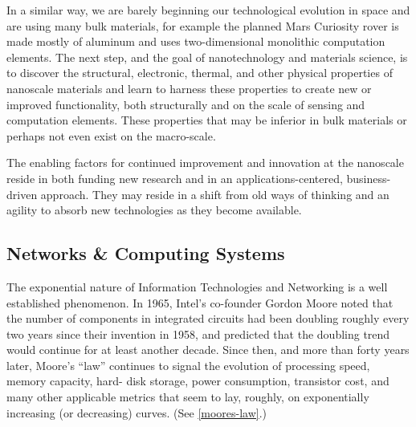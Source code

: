 \documentclass[letter,11pt]{article}
\begin{document}
In a similar way, we are barely beginning our technological evolution in space
and are using many bulk materials, for example the planned Mars Curiosity rover
is made mostly of aluminum and uses two-dimensional monolithic computation
elements. The next step, and the goal of nanotechnology and materials science,
is to discover the structural, electronic, thermal, and other physical
properties of nanoscale materials and learn to harness these properties to
create new or improved functionality, both structurally and on the scale of
sensing and computation elements. These properties that may be inferior in bulk
materials or perhaps not even exist on the macro-scale.

The enabling factors for continued improvement and innovation at the nanoscale
reside in both funding new research and in an applications-centered,
business-driven approach. They may reside in a shift from old ways of thinking
and an agility to absorb new technologies as they become available.

\subsection{Networks \& Computing Systems}
\label{et-computing}

The exponential nature of Information Technologies and Networking is a well
established phenomenon. In 1965, Intel's co-founder Gordon Moore noted that the
number of components in integrated circuits had been doubling roughly every two
years since their invention in 1958, and predicted that the doubling trend
would continue for at least another decade. Since then, and more than forty
years later, Moore's ``law'' continues to signal the evolution of processing
speed, memory capacity, hard- disk storage, power consumption, transistor cost,
and many other applicable metrics that seem to lay, roughly, on exponentially
increasing (or decreasing) curves. (See \autoref{moores-law}.)
\end{document}

